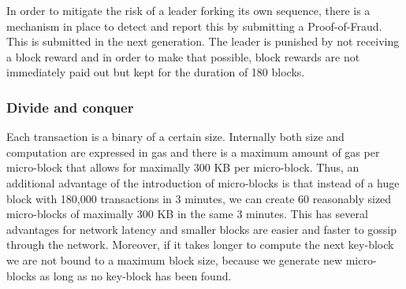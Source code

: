 In order to mitigate the risk of a leader forking its own sequence,
there is a mechanism in place to detect and report this by submitting
a Proof-of-Fraud. This is submitted in the next
generation. The leader is punished by not receiving a block reward and
in order to make that possible, block rewards are not immediately paid out but
kept for the duration of 180 blocks.

\subsubsection{Divide and conquer}

Each transaction is a binary of a certain size. Internally both size
and computation are expressed in gas and there is a maximum amount of
gas per micro-block that allows for maximally 300 KB per micro-block.
Thus, an additional advantage of the introduction of micro-blocks is that
instead of a huge block with 180,000 transactions in 3 minutes, we can create
60
reasonably sized micro-blocks of maximally 300 KB  in the same 3
minutes. This has several advantages for network latency and
smaller blocks are easier and faster to gossip through the
network. Moreover, if it takes longer to compute the next key-block we
are not bound to a maximum block size, because we generate new
micro-blocks as long as no key-block has been found.
